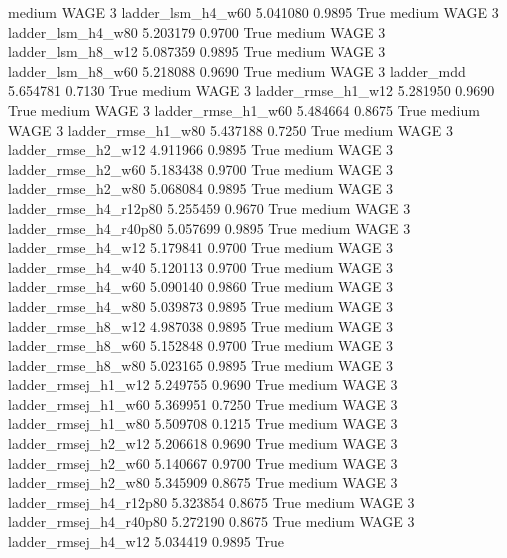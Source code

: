     medium     WAGE                 3      ladder_lsm_h4_w60   5.041080      0.9895    True
    medium     WAGE                 3      ladder_lsm_h4_w80   5.203179      0.9700    True
    medium     WAGE                 3      ladder_lsm_h8_w12   5.087359      0.9895    True
    medium     WAGE                 3      ladder_lsm_h8_w60   5.218088      0.9690    True
    medium     WAGE                 3             ladder_mdd   5.654781      0.7130    True
    medium     WAGE                 3     ladder_rmse_h1_w12   5.281950      0.9690    True
    medium     WAGE                 3     ladder_rmse_h1_w60   5.484664      0.8675    True
    medium     WAGE                 3     ladder_rmse_h1_w80   5.437188      0.7250    True
    medium     WAGE                 3     ladder_rmse_h2_w12   4.911966      0.9895    True
    medium     WAGE                 3     ladder_rmse_h2_w60   5.183438      0.9700    True
    medium     WAGE                 3     ladder_rmse_h2_w80   5.068084      0.9895    True
    medium     WAGE                 3  ladder_rmse_h4_r12p80   5.255459      0.9670    True
    medium     WAGE                 3  ladder_rmse_h4_r40p80   5.057699      0.9895    True
    medium     WAGE                 3     ladder_rmse_h4_w12   5.179841      0.9700    True
    medium     WAGE                 3     ladder_rmse_h4_w40   5.120113      0.9700    True
    medium     WAGE                 3     ladder_rmse_h4_w60   5.090140      0.9860    True
    medium     WAGE                 3     ladder_rmse_h4_w80   5.039873      0.9895    True
    medium     WAGE                 3     ladder_rmse_h8_w12   4.987038      0.9895    True
    medium     WAGE                 3     ladder_rmse_h8_w60   5.152848      0.9700    True
    medium     WAGE                 3     ladder_rmse_h8_w80   5.023165      0.9895    True
    medium     WAGE                 3    ladder_rmsej_h1_w12   5.249755      0.9690    True
    medium     WAGE                 3    ladder_rmsej_h1_w60   5.369951      0.7250    True
    medium     WAGE                 3    ladder_rmsej_h1_w80   5.509708      0.1215    True
    medium     WAGE                 3    ladder_rmsej_h2_w12   5.206618      0.9690    True
    medium     WAGE                 3    ladder_rmsej_h2_w60   5.140667      0.9700    True
    medium     WAGE                 3    ladder_rmsej_h2_w80   5.345909      0.8675    True
    medium     WAGE                 3 ladder_rmsej_h4_r12p80   5.323854      0.8675    True
    medium     WAGE                 3 ladder_rmsej_h4_r40p80   5.272190      0.8675    True
    medium     WAGE                 3    ladder_rmsej_h4_w12   5.034419      0.9895    True

